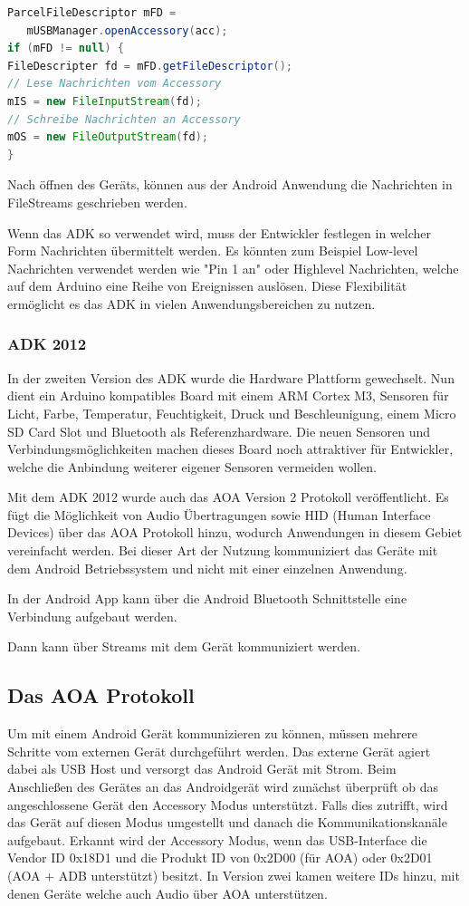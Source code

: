 \documentclass[12pt,journal,compsoc]{IEEEtran}
\begin{document}
\begin{lstlisting}[language=Java]
ParcelFileDescriptor mFD = 
   mUSBManager.openAccessory(acc);
if (mFD != null) {
FileDescripter fd = mFD.getFileDescriptor();
// Lese Nachrichten vom Accessory 
mIS = new FileInputStream(fd);  
// Schreibe Nachrichten an Accessory 
mOS = new FileOutputStream(fd); 
}
\end{lstlisting}
Nach öffnen des Geräts, können aus der Android Anwendung die Nachrichten in FileStreams geschrieben werden.

Wenn das ADK so verwendet wird, muss der Entwickler festlegen in welcher Form Nachrichten übermittelt werden. 
Es könnten zum Beispiel Low-level Nachrichten verwendet werden wie "Pin 1 an" oder Highlevel Nachrichten, welche auf dem Arduino eine Reihe von Ereignissen auslösen.
Diese Flexibilität ermöglicht es das ADK in vielen Anwendungsbereichen zu nutzen.

\subsubsection{ADK 2012}
In der zweiten Version des ADK wurde die Hardware Plattform gewechselt. Nun dient ein Arduino kompatibles Board mit einem ARM Cortex M3, Sensoren für Licht, Farbe, Temperatur, Feuchtigkeit, Druck und Beschleunigung, einem Micro SD Card Slot und Bluetooth als Referenzhardware.
Die neuen Sensoren und Verbindungsmöglichkeiten machen dieses Board noch attraktiver für Entwickler, welche die Anbindung weiterer eigener Sensoren vermeiden wollen.

Mit dem ADK 2012 wurde auch das AOA Version 2 Protokoll veröffentlicht.
Es fügt die Möglichkeit von Audio Übertragungen sowie HID (Human Interface Devices) über das AOA Protokoll hinzu, wodurch Anwendungen in diesem Gebiet vereinfacht werden.
Bei dieser Art der Nutzung kommuniziert das Geräte mit dem Android Betriebssystem und nicht mit einer einzelnen Anwendung.


In der Android App kann über die Android Bluetooth Schnittstelle eine Verbindung aufgebaut werden.

Dann kann über Streams mit dem Gerät kommuniziert werden.

\subsection{Das AOA Protokoll}
Um mit einem Android Gerät kommunizieren zu können, müssen mehrere Schritte vom externen Gerät durchgeführt werden.
Das externe Gerät agiert dabei als USB Host und versorgt das Android Gerät mit Strom.
Beim Anschließen des Gerätes an das Androidgerät wird zunächst überprüft ob das angeschlossene Gerät den Accessory Modus unterstützt.
Falls dies zutrifft, wird das Gerät auf diesen Modus umgestellt und danach die Kommunikationskanäle aufgebaut.
Erkannt wird der Accessory Modus, wenn das USB-Interface die Vendor ID 0x18D1 und die Produkt ID von 0x2D00 (für AOA) oder 0x2D01 (AOA + ADB unterstützt) besitzt.
In Version zwei kamen weitere IDs hinzu, mit denen Geräte welche auch Audio über AOA unterstützen.
\end{document}
